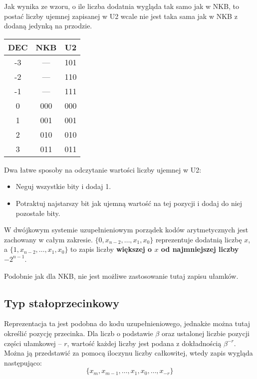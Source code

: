 Jak wynika ze wzoru, o ile liczba dodatnia wygląda tak samo jak w NKB, to postać liczby ujemnej zapisanej w U2 wcale nie jest taka sama jak w NKB z dodaną jedynką na przodzie.

\begin{table}[H]
	\centering
	\begin{tabular}{|c|c|c|} \hline
		DEC	&	NKB		&	U2	\\ \hline
		-3	&	---		&	101\\ \hline
		-2	&	---		&	110\\ \hline
		-1	&	---		&	111\\ \hline
		0	&	000		&	000\\ \hline
		1	&	001		&	001\\ \hline
		2	&	010		&	010\\ \hline
		3	&	011		&	011\\ \hline
	\end{tabular}
\end{table}

Dwa łatwe sposoby na odczytanie wartości liczby ujemnej w U2:
\begin{itemize}
	\setlength\itemsep{1pt}
	\item{Neguj wszystkie bity i dodaj 1.}
	\item{Potraktuj najstarszy bit jak ujemną wartość na tej pozycji i dodaj do niej pozostałe bity.}
\end{itemize}

W dwójkowym systemie uzupełnieniowym porządek kodów arytmetycznych jest zachowany w całym zakresie. $\{0, x_{n-2},\ldots,x_{1},x_{0}\}$ reprezentuje dodatnią liczbę $x$, a $\{1, x_{n-2},\ldots,x_{1},x_{0}\}$ to zapis liczby \textbf{większej o $x$ od najmniejszej liczby $-2^{n-1}$}.

Podobnie jak dla NKB, nie jest możliwe zastosowanie tutaj zapisu ułamków.

\subsection{Typ stałoprzecinkowy}
Reprezentacja ta jest podobna do kodu uzupełnieniowego, jednakże można tutaj określić pozycję przecinka. Dla liczb o podstawie $\beta$ oraz ustalonej liczbie pozycji części ułamkowej -- $r$, wartość każdej liczby jest podana z dokładnością $\beta^{-r}$. Można ją przedstawić za pomocą iloczynu liczby całkowitej, wtedy zapis wygląda następująco:
\begin{equation}
\{x_{m},x_{m-1},\ldots,x_{1},x_{0},\ldots,x_{-r}\}
\end{equation}

